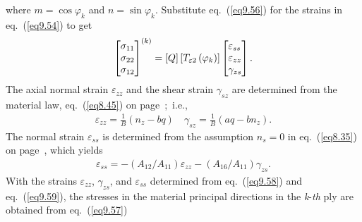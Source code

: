 \documentclass{AeroStructure-ERJohnson}
\begin{document}
where $m=\cos \varphi_{k}$ and $n=\sin \varphi_{k}$. Substitute eq.~(\ref{eq9.56}) for the strains in eq.~(\ref{eq9.54}) to get
\begin{align}\label{eq9.57}
\left[\begin{array}{@{}l@{}}\sigma_{11} \\\sigma_{22} \\\sigma_{12}\end{array}\right]^{(k)}=[Q]\left[T_{\varepsilon 2}\left(\varphi_{k}\right)\right]\left[\begin{array}{@{}l@{}}\varepsilon_{s s} \\\varepsilon_{z z} \\\gamma_{z s}\end{array}\right].
\end{align}
The axial normal strain $\varepsilon_{z z}$ and the shear strain $\gamma_{s z}$ are determined from the material law, eq.~(\ref{eq8.45}) on page~\pageref{eq8.45};~i.e.,
\begin{align}\label{eq9.58}
\varepsilon_{z z}=\frac{1}{B}\left(n_{z}-b q\right) \quad \gamma_{s z}=\frac{1}{B}\left(a q-b n_{z}\right).
\end{align}
The normal strain $\varepsilon_{ss}$ is determined from the assumption $n_{s}=0$ in eq.~(\ref{eq8.35}) on page~\pageref{eq8.35}, which yields
\begin{align}\label{eq9.59}
\varepsilon_{s s}=-\left(A_{12}/A_{11}\right) \varepsilon_{z z}-\left(A_{16}/A_{11}\right) \gamma_{z s}.
\end{align}
With the strains $\varepsilon_{z z}$, $\gamma_{zs}$, and $\varepsilon_{ss}$ determined from eq.~(\ref{eq9.58}) and eq.~(\ref{eq9.59}), the stresses in the material principal directions in the \textit{k}-\textit{th} ply are obtained from eq.~(\ref{eq9.57})
\end{document}
